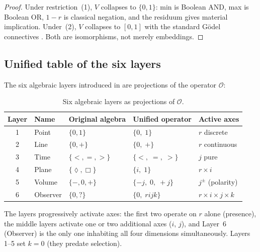 \documentclass[11pt,a4paper]{article}
\newcommand{\Op}{\mathcal{O}}
\newcommand{\rey}[1]{{\color{rcolor}#1}}
\newcommand{\imag}[1]{{\color{icolor}#1}}
\newcommand{\exac}[1]{{\color{jcolor}#1}}
\newcommand{\recu}[1]{{\color{kcolor}#1}}
\def\rey#1{#1}%
\def\imag#1{#1}%
\def\exac#1{#1}%
\def\recu#1{#1}%
\begin{document}
\begin{proof}
Under restriction~(1), $V$ collapses to $\{0,1\}$: min is Boolean
AND, max is Boolean OR, $1-r$ is classical negation, and the
residuum gives material implication. Under~(2), $V$ collapses to
$[0,1]$ with the standard G\"odel connectives
\citep{hajek1998}. Both are isomorphisms, not merely embeddings.
\end{proof}

\subsection{Unified table of the six layers}

The six algebraic layers introduced in \citet{p4} are projections
of the operator $\Op$:

\begin{table}[H]
\centering
\renewcommand{\arraystretch}{1.4}
\caption{Six algebraic layers as projections of $\Op$.}
\label{tab:unified}
\begin{tabularx}{\textwidth}{@{}cl >{\raggedright}p{2cm} >{\raggedright}p{3cm} >{\raggedright\arraybackslash}p{4cm}@{}}
\toprule
\textbf{Layer} & \textbf{Name} & \textbf{Original algebra} &
\textbf{Unified operator} & \textbf{Active axes} \\
\midrule
1 & Point    & $\{0, 1\}$           & $\{0,\; \rey{1}\}$
  & $\rey{r}$ discrete \\
2 & Line     & $\{0, +\}$           & $\{0,\; \rey{+}\}$
  & $\rey{r}$ continuous \\
3 & Time     & $\{<, =, >\}$        & $\{\exac{<},\; \exac{=},\; \exac{>}\}$
  & $\exac{j}$ pure \\
4 & Plane    & $\{\lozenge, \Box\}$ & $\{\imag{i},\; \rey{1}\}$
  & $\rey{r} \times \imag{i}$ \\
5 & Volume   & $\{-, 0, +\}$        & $\{\exac{-j},\; 0,\; \exac{+j}\}$
  & $\exac{j^{\pm}}$ (polarity) \\
6 & Observer & $\{0, ?\}$           & $\{0,\;\rey{r}\imag{i}\exac{j}\recu{k}\}$
  & $\rey{r} \times \imag{i} \times \exac{j} \times \recu{k}$ \\
\bottomrule
\end{tabularx}
\end{table}

\noindent
The layers progressively activate axes: the first two operate on
$\rey{r}$ alone (presence), the middle layers activate one or two
additional axes ($\imag{i}$, $\exac{j}$), and Layer~6 (Observer) is
the only one inhabiting all four dimensions simultaneously. Layers
1--5 set $\recu{k}=0$ (they predate selection).
\end{document}
